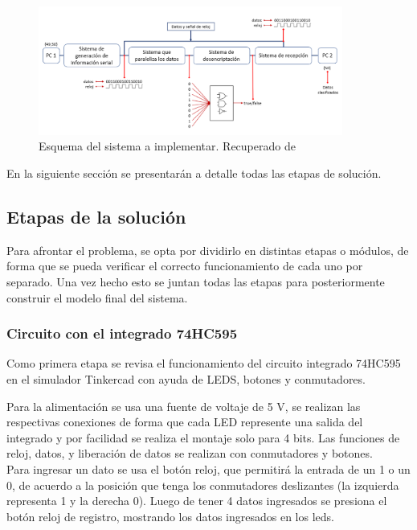 \documentclass{article}
\begin{document}
\begin{figure}[!ht]
\includegraphics[width=10cm]{esquema.PNG}
\centering
\caption{Esquema del sistema a implementar. Recuperado de \cite{augusto}}
\end{figure}

En la siguiente sección se presentarán a detalle todas las etapas de solución.

\subsection{Etapas de la solución}

Para afrontar el problema, se opta por dividirlo en distintas etapas o módulos, de forma que se pueda verificar el correcto funcionamiento de cada uno por separado. Una vez hecho esto se juntan todas las etapas para posteriormente construir el modelo final del sistema.\\
\subsubsection{Circuito con el integrado 74HC595}

Como primera etapa se revisa el funcionamiento del circuito integrado 74HC595 en el simulador Tinkercad con ayuda de LEDS, botones y conmutadores. 

Para la alimentación se usa una fuente de voltaje de 5 V, se realizan las respectivas conexiones de forma que cada LED represente una salida del integrado y por facilidad se realiza el montaje solo para 4 bits. Las funciones de reloj, datos, y liberación de datos se realizan con conmutadores y botones.\\

Para ingresar un dato se usa el botón reloj, que permitirá la entrada de un 1 o un 0, de acuerdo a la posición que tenga los conmutadores deslizantes (la izquierda representa 1 y la derecha 0). Luego de tener 4 datos ingresados se presiona el botón reloj de registro, mostrando los datos ingresados en los leds.\\
\end{document}
